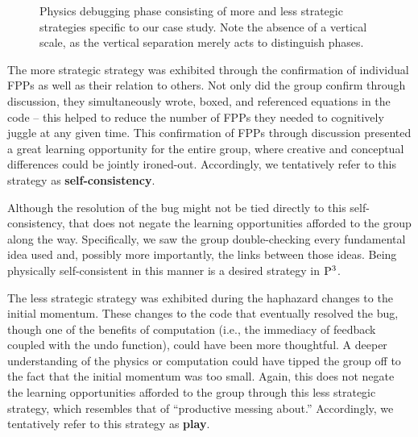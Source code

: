 \documentclass{msuphddissertation}
\begin{document}
\begin{doublespace}
\begin{figure}
\caption{Physics debugging phase consisting of more and less strategic strategies specific to our case study.  Note the absence of a vertical scale, as the vertical separation merely acts to distinguish phases.}
\label{strategy}
\end{figure}

The more strategic strategy was exhibited through the confirmation of individual FPPs as well as their relation to others.  Not only did the group confirm through discussion, they simultaneously wrote, boxed, and referenced equations in the code -- this helped to reduce the number of FPPs they needed to cognitively juggle at any given time.\cite{Redish2003}  This confirmation of FPPs through discussion presented a great learning opportunity for the entire group, where creative and conceptual differences could be jointly ironed-out.  Accordingly, we tentatively refer to this strategy as \textbf{self-consistency}.

Although the resolution of the bug might not be tied directly to this self-consistency, that does not negate the learning opportunities afforded to the group along the way.  Specifically, we saw the group double-checking every fundamental idea used and, possibly more importantly, the links between those ideas.  Being physically self-consistent in this manner is a desired strategy in ${\rm P}^{3}$.

The less strategic strategy was exhibited during the haphazard changes to the initial momentum.  These changes to the code that eventually resolved the bug, though one of the benefits of computation (i.e., the immediacy of feedback coupled with the undo function), could have been more thoughtful.  A deeper understanding of the physics or computation could have tipped the group off to the fact that the initial momentum was too small.  Again, this does not negate the learning opportunities afforded to the group through this less strategic strategy, which resembles that of ``productive messing about.''\cite{Podolefsky2012}  Accordingly, we tentatively refer to this strategy as \textbf{play}.


\end{doublespace}
\end{document}
